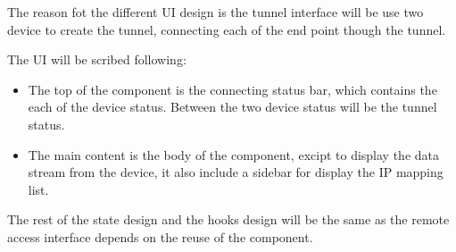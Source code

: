The reason fot the different UI design is the tunnel interface will be use two device to create the tunnel,
connecting each of the end point though the tunnel.

The UI will be scribed following:
\begin{itemize}
    \item The top of the component is the connecting status bar, which contains the each of the device status.
    Between the two device status will be the tunnel status. 
    \item The main content is the body of the component, excipt to display the data stream from the device, 
    it also include a sidebar for display the IP mapping list.
\end{itemize}

The rest of the state design and the hooks design will be the same as the remote access interface 
depends on the reuse of the component. 